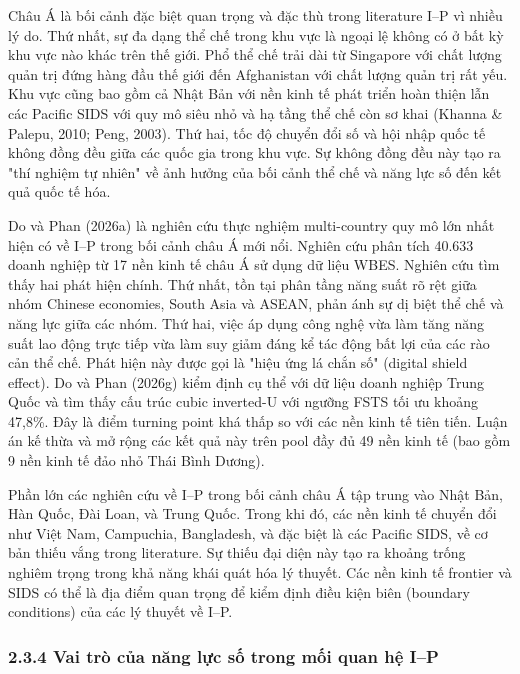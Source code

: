 \documentclass[12pt,a4paper]{article}
\begin{document}
Châu Á là bối cảnh đặc biệt quan trọng và đặc thù trong literature I--P
vì nhiều lý do. Thứ nhất, sự đa dạng thể chế trong khu vực là ngoại lệ
không có ở bất kỳ khu vực nào khác trên thế giới. Phổ thể chế trải dài
từ Singapore với chất lượng quản trị đứng hàng đầu thế giới đến
Afghanistan với chất lượng quản trị rất yếu. Khu vực cũng bao gồm cả
Nhật Bản với nền kinh tế phát triển hoàn thiện lẫn các Pacific SIDS với
quy mô siêu nhỏ và hạ tầng thể chế còn sơ khai (Khanna \& Palepu, 2010;
Peng, 2003). Thứ hai, tốc độ chuyển đổi số và hội nhập quốc tế không
đồng đều giữa các quốc gia trong khu vực. Sự không đồng đều này tạo ra
"thí nghiệm tự nhiên" về ảnh hưởng của bối cảnh thể chế và năng lực số
đến kết quả quốc tế hóa.

Do và Phan (2026a) là nghiên cứu thực nghiệm multi-country quy mô lớn
nhất hiện có về I--P trong bối cảnh châu Á mới nổi. Nghiên cứu phân tích
40.633 doanh nghiệp từ 17 nền kinh tế châu Á sử dụng dữ liệu WBES.
Nghiên cứu tìm thấy hai phát hiện chính. Thứ nhất, tồn tại phân tầng
năng suất rõ rệt giữa nhóm Chinese economies, South Asia và ASEAN, phản
ánh sự dị biệt thể chế và năng lực giữa các nhóm. Thứ hai, việc áp dụng
công nghệ vừa làm tăng năng suất lao động trực tiếp vừa làm suy giảm
đáng kể tác động bất lợi của các rào cản thể chế. Phát hiện này được gọi
là "hiệu ứng lá chắn số" (digital shield effect). Do và Phan (2026g)
kiểm định cụ thể với dữ liệu doanh nghiệp Trung Quốc và tìm thấy cấu
trúc cubic inverted-U với ngưỡng FSTS tối ưu khoảng 47,8\%. Đây là điểm
turning point khá thấp so với các nền kinh tế tiên tiến. Luận án kế thừa
và mở rộng các kết quả này trên pool đầy đủ 49 nền kinh tế (bao gồm 9
nền kinh tế đảo nhỏ Thái Bình Dương).

Phần lớn các nghiên cứu về I--P trong bối cảnh châu Á tập trung vào Nhật
Bản, Hàn Quốc, Đài Loan, và Trung Quốc. Trong khi đó, các nền kinh tế
chuyển đổi như Việt Nam, Campuchia, Bangladesh, và đặc biệt là các
Pacific SIDS, về cơ bản thiếu vắng trong literature. Sự thiếu đại diện
này tạo ra khoảng trống nghiêm trọng trong khả năng khái quát hóa lý
thuyết. Các nền kinh tế frontier và SIDS có thể là địa điểm quan trọng
để kiểm định điều kiện biên (boundary conditions) của các lý thuyết về
I--P.

\hypertarget{234-vai-truxf2-cux1ee7a-nux103ng-lux1ef1c-sux1ed1-trong-mux1ed1i-quan-hux1ec7-ip}{%
\subsubsection{2.3.4 Vai trò của năng lực số trong mối quan hệ
I--P}\label{234-vai-truxf2-cux1ee7a-nux103ng-lux1ef1c-sux1ed1-trong-mux1ed1i-quan-hux1ec7-ip}}
\end{document}
